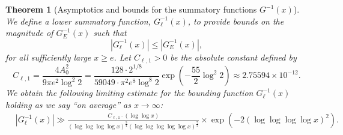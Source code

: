 \documentclass[11pt,reqno,a4letter]{article}
\numberwithin{figure}{section}
\numberwithin{table}{section}
\theoremstyle{plain}
\newtheorem{theorem}{Theorem}
\numberwithin{theorem}{section}
\theoremstyle{definition}
\newcommand{\NBRef}[1]{}
\newcommand{\SuccSim}[0]{\overset{_{\scriptsize{\blacktriangle}}}{\succsim}}
\renewcommand{\SuccSim}[0]{\ensuremath{\gg}}
\begin{document}
\begin{theorem}[Asymptotics and bounds for the summatory functions $G^{-1}(x)$] 
\label{theorem_gInv_GeneralAsymptoticsForms}
We define a lower summatory function, $G_{\ell}^{-1}(x)$, 
to provide bounds on the magnitude of $G_E^{-1}(x)$ such that 
$$|G_{\ell}^{-1}(x)| \leq |G_E^{-1}(x)|,$$ 
for all sufficiently large $x \geq e$. 
Let $C_{\ell,1} > 0$ be the absolute constant defined by 
\[
C_{\ell,1} = \frac{4 A_0^2}{9 \pi e^2 \log^2 2}  = 
     \frac{128 \cdot 2^{1/8}}{59049 \cdot \pi^2 e^8 \log^8 2} 
     \exp\left(-\frac{55}{2} \log^2 2\right) 
     \approx 2.75594 \times 10^{-12}.  
\]
We obtain the following limiting estimate for the bounding function 
$G_{\ell}^{-1}(x)$ holding as we say ``on average'' as $x \rightarrow \infty$:   
\begin{align*} 
 & \left\lvert G_{\ell}^{-1}\left(x\right) \right\rvert
     \SuccSim 
     \frac{C_{\ell,1} \cdot (\log\log x)}{(\log\log\log\log x)^{\frac{9}{4}} 
     (\log\log\log\log\log x)^{\frac{7}{2}}} \times 
     \exp\left(-2 (\log\log\log\log x)^2\right). 
\end{align*} 
\end{theorem} 
\NBRef{A10-2020.04-26} 
\end{document}
